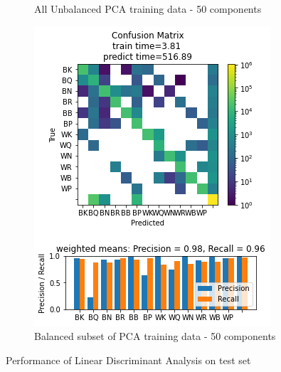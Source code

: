 \documentclass{article}
\newcommand{\FIGLABEL}[1]{Performance of #1 on test set}
\newcommand{\PCAFL}{All Unbalanced PCA training data - 50 components}
\newcommand{\PCABL}{Balanced subset of PCA training data - 50 components}
\begin{document}
\begin{figure}[h]
\begin{subfigure}{0.33\textwidth}
\caption{\PCAFL}
\end{subfigure}
\begin{subfigure}{0.33\textwidth}
\includegraphics[width=0.9\linewidth]{LDA_B_PCA50c_160x160_evaluation.png} 
\caption{\PCABL}
\end{subfigure}
\caption{\FIGLABEL{Linear Discriminant Analysis}}
\label{fig:LDA}
\end{figure}
\end{document}
